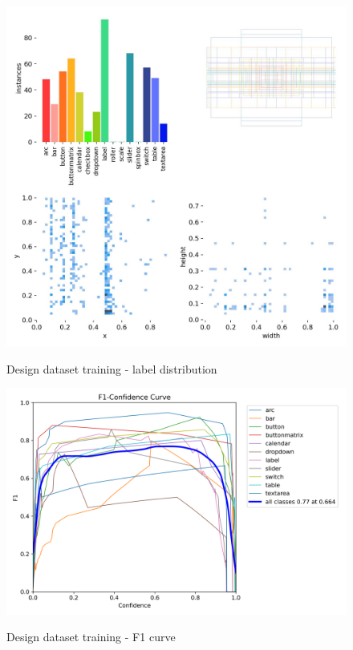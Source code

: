 \documentclass[Bachelor, BIC, english, fhCitStyle, IEEE]{BASE/twbook} %
\begin{document}
\begin{figure}
    \caption{Design dataset training - label distribution}
    \centering
    \includegraphics[width=\textwidth]{PICs/train373/labels.jpg}
    \label{fig:design-training-labels}
\end{figure}
\begin{figure}
    \caption{Design dataset training - F1 curve}
    \centering
    \includegraphics[width=\textwidth]{PICs/train373/F1_curve.png}
    \label{fig:design-training-f1}
\end{figure}
\clearpage
\end{document}
